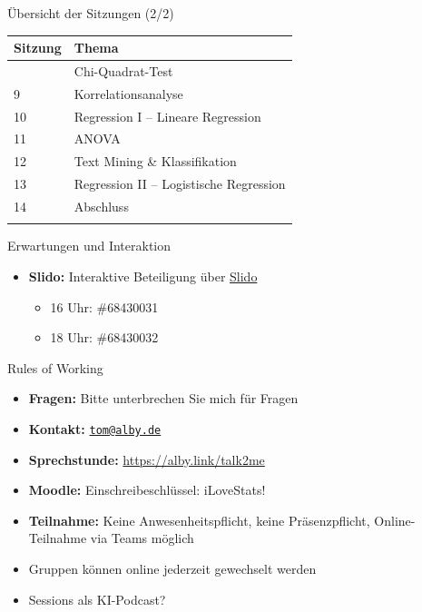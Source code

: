 \documentclass[
  ignorenonframetext,
]{beamer}
\newcounter{none} %
\providecommand{\tightlist}{%
  \setlength{\itemsep}{0pt}\setlength{\parskip}{0pt}}
\begin{document}
\begin{frame}{Übersicht der Sitzungen (2/2)}
\protect{}\label{uxfcbersicht-der-sitzungen-22}
{\def\LTcaptype{none} %
\begin{longtable}[]{@{}ll@{}}
\toprule\noalign{}
Sitzung & Thema \\
\midrule\noalign{}
\endhead
8 & Chi-Quadrat-Test \\
9 & Korrelationsanalyse \\
10 & Regression I -- Lineare Regression \\
11 & ANOVA \\
12 & Text Mining \& Klassifikation \\
13 & Regression II -- Logistische Regression \\
14 & Abschluss \\
\bottomrule\noalign{}
\end{longtable}
}
\end{frame}

\begin{frame}{Erwartungen und Interaktion}
\protect{}\label{erwartungen-und-interaktion}
\begin{itemize}
\tightlist
\item
  \textbf{Slido:} Interaktive Beteiligung über
  \href{https://app.sli.do}{Slido}

  \begin{itemize}
  \tightlist
  \item
    16 Uhr: \#68430031
  \item
    18 Uhr: \#68430032
  \end{itemize}
\end{itemize}
\end{frame}

\begin{frame}{Rules of Working}
\protect{}\label{rules-of-working}
\begin{itemize}
\tightlist
\item
  \textbf{Fragen:} Bitte unterbrechen Sie mich für Fragen
\item
  \textbf{Kontakt:} \href{mailto:tom@alby.de}{\nolinkurl{tom@alby.de}}
\item
  \textbf{Sprechstunde:} \url{https://alby.link/talk2me}
\item
  \textbf{Moodle:} Einschreibeschlüssel: iLoveStats!
\item
  \textbf{Teilnahme:} Keine Anwesenheitspflicht, keine Präsenzpflicht,
  Online-Teilnahme via Teams möglich
\item
  Gruppen können online jederzeit gewechselt werden
\item
  Sessions als KI-Podcast?
\end{itemize}
\end{frame}
\end{document}
